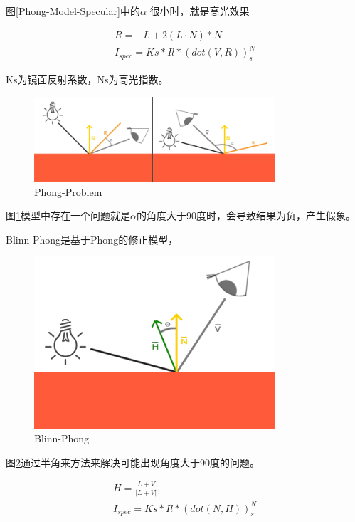 图\ref{Phong-Model-Specular}中的$\alpha$ 很小时，就是高光效果

\begin{align*}
    R = -L + 2(L \cdot N) * N \\
    I_{spec}=Ks * Il * (dot(V, R))^N_{s}
\end{align*}

Ks为镜面反射系数，Ns为高光指数。

\begin{figure}[htbp]
    \centering
    \includegraphics[width=0.8\textwidth]{images/classical-phong.png}
    \caption{Phong-Problem}\label{Phong-Problem}
\end{figure}
图\ref{Phong-Problem}模型中存在一个问题就是$\alpha$的角度大于90度时，会导致结果为负，产生假象。

Blinn-Phong是基于Phong的修正模型，

\begin{figure}[htbp]
    \centering
    \includegraphics[width=0.8\textwidth]{images/blinn-phong.png}
    \caption{Blinn-Phong}\label{Blinn-Phong}
\end{figure}

图\ref{Blinn-Phong}通过半角来方法来解决可能出现角度大于90度的问题。

\begin{align*}
    H = \frac{L + V}{|L + V|}, \\
    I_{spec} = Ks * Il * (dot(N, H))^N_{s}
\end{align*}

